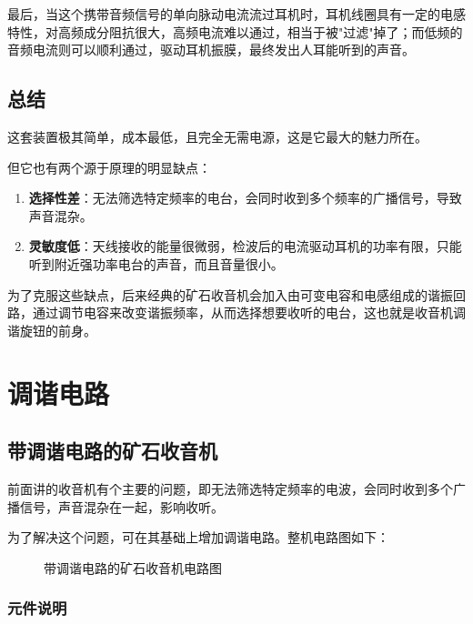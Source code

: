 \documentclass[12pt,UTF8]{ctexbook}
\begin{document}
最后，当这个携带音频信号的单向脉动电流流过耳机时，耳机线圈具有一定的电感特性，对高频成分阻抗很大，高频电流难以通过，相当于被"过滤"掉了；而低频的音频电流则可以顺利通过，驱动耳机振膜，最终发出人耳能听到的声音。

\section{总结}

这套装置极其简单，成本最低，且完全无需电源，这是它最大的魅力所在。

但它也有两个源于原理的明显缺点：

\begin{enumerate}[leftmargin=2cm]
	\item \textbf{选择性差}：无法筛选特定频率的电台，会同时收到多个频率的广播信号，导致声音混杂。
	\item \textbf{灵敏度低}：天线接收的能量很微弱，检波后的电流驱动耳机的功率有限，只能听到附近强功率电台的声音，而且音量很小。
\end{enumerate}

为了克服这些缺点，后来经典的矿石收音机会加入由可变电容和电感组成的谐振回路，通过调节电容来改变谐振频率，从而选择想要收听的电台，这也就是收音机调谐旋钮的前身。


\chapter{调谐电路}
\label{chap:tuning-circuit}

\section{带调谐电路的矿石收音机}

前面讲的收音机有个主要的问题，即无法筛选特定频率的电波，会同时收到多个广播信号，声音混杂在一起，影响收听。

为了解决这个问题，可在其基础上增加调谐电路。整机电路图如下：

\begin{figure}[H]
	\centering
	\caption{带调谐电路的矿石收音机电路图}
	\label{fig:tuned-crystal-radio}
\end{figure}

\subsection{元件说明}
\end{document}

